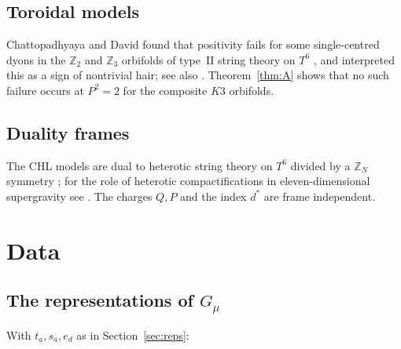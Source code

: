 \documentclass[11pt]{amsart}
\theoremstyle{definition}
\newcommand{\ZZ}{\mathbb{Z}}
\begin{document}
\subsection*{Toroidal models}
Chattopadhyaya and David found that positivity fails for some single-centred dyons in the $\ZZ_2$ and $\ZZ_3$ orbifolds of type~II string theory on $T^6$ \cite{CD19}, and interpreted this as a sign of nontrivial hair; see also \cite{CD21}. Theorem~\ref{thm:A} shows that no such failure occurs at $P^2=2$ for the composite $K3$ orbifolds.

\subsection*{Duality frames}
The CHL models are dual to heterotic string theory on $T^6$ divided by a $\ZZ_N$ symmetry \cite{CHL95}; for the role of heterotic compactifications in eleven-dimensional supergravity see \cite{SBBT26}. The charges $Q,P$ and the index $d^*$ are frame independent.

\appendix

\section{Data}\label{app:data}

\subsection*{The representations of \texorpdfstring{$G_\mu$}{G\_mu}}
With $t_a,s_a,e_d$ as in Section~\ref{sec:reps}:
\end{document}
